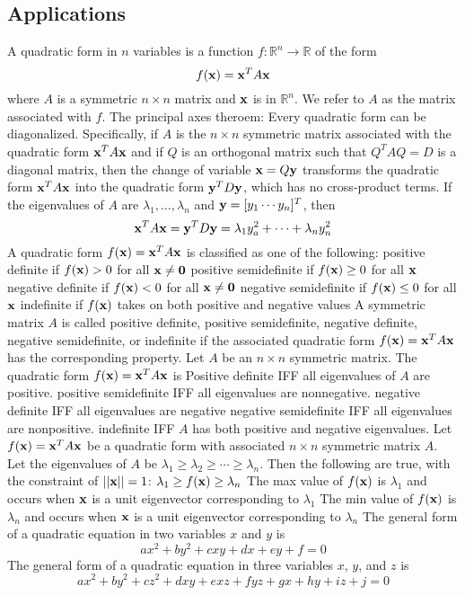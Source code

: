 \documentclass{article}
\begin{document}
    \subsection{Applications}
    \begin{outline}
        \1 A quadratic form in $n$ variables is a function \(f:\mathbb R^n\to\mathbb R\) of the form \[f(\vb x)=\vb x^TA\vb x\] where $A$ is a symmetric \(n\times n\) matrix and \(\vb x\) is in \(\mathbb R^n\). We refer to $A$ as the matrix associated with $f$. 
        \1 The principal axes theroem: Every quadratic form can be diagonalized. Specifically, if $A$ is the \(n\times n\) symmetric matrix associated with the quadratic form \(\vb x^TA\vb x\) and if $Q$ is an orthogonal matrix such that \(Q^TAQ=D\) is a diagonal matrix, then the change of variable \(\vb x=Q\vb y\) transforms the quadratic form \(\vb x^TA\vb x\) into the quadratic form \(\vb y^TD\vb y\), which has no cross-product terms. If the eigenvalues of $A$ are \(\lambda_1,\ldots,\lambda_n\) and \(\vb y=[y_1\cdots y_n]^T\), then \[\vb x^TA\vb x=\vb y^TD\vb y=\lambda_1y_a^2+\cdots+\lambda_ny_n^2\]
        \1 A quadratic form \(f(\vb x)=\vb x^TA\vb x\) is classified as one of the following: 
            \2 positive definite if \(f(\vb x)>0\) for all \(\vb x\neq\vb 0\)
            \2 positive semidefinite if \(f(\vb x)\geq0\) for all \(\vb x\)
            \2 negative definite if \(f(\vb x)<0\) for all \(\vb x\neq\vb 0\)
            \2 negative semidefinite if \(f(\vb x)\leq0\) for all \(\vb x\)
            \2 indefinite if \(f(\vb x)\) takes on both positive and negative values
        \1 A symmetric matrix $A$ is called positive definite, positive semidefinite, negative definite, negative semidefinite, or indefinite if the associated quadratic form \(f(\vb x)=\vb x^TA\vb x\) has the corresponding property. 
        \1 Let $A$ be an \(n\times n\) symmetric matrix. The quadratic form \(f(\vb x)=\vb x^TA\vb x\) is 
            \2 Positive definite IFF all eigenvalues of $A$ are positive. 
            \2 positive semidefinite IFF all eigenvalues are nonnegative. 
            \2 negative definite IFF all eigenvalues are negative
            \2 negative semidefinite IFF all eigenvalues are nonpositive. 
            \2 indefinite IFF $A$ has both positive and negative eigenvalues. 
        \1 Let \(f(\vb x)=\vb x^TA\vb x\) be a quadratic form with associated \(n\times n\) symmetric matrix $A$. Let the eigenvalues of $A$ be \(\lambda_1\geq\lambda_2\geq\cdots\geq\lambda_n\). Then the following are true, with the constraint of \(||\vb x||=1\): 
            \2 \(\lambda_1\geq f(\vb x)\geq\lambda_n\)
            \2 The max value of \(f(\vb x)\) is \(\lambda_1\) and occurs when \(\vb x\) is a unit eigenvector corresponding to \(\lambda_1\)
            \2 The min value of \(f(\vb x)\) is \(\lambda_n\) and occurs when \(\vb x\) is a unit eigenvector corresponding to \(\lambda_n\)
        \1 The general form of a quadratic equation in two variables $x$ and $y$ is \[ax^2+by^2+cxy+dx+ey+f=0\]
        \1 The general form of a quadratic equation in three variables $x$, $y$, and $z$ is \[ax^2+by^2+cz^2+dxy+exz+fyz+gx+hy+iz+j=0\]
        
    \end{outline}
\end{document}
